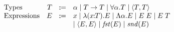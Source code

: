 \[
\begin{array}{lrrl}
  \text{Types} & T & \dcoloneq &
    \alpha
    \mid T \to T
    \mid \forall \alpha. T
    \mid \langle T, T \rangle \\

  \text{Expressions} & E & \dcoloneq &
    x
    \mid \abs{\rel{x}{T}}{E}
    \mid \Abs{\alpha}{E}
    \mid \app{E}{E}
    \mid \app{E}{T} \\ & & &
    \mid \langle E, E \rangle
    \mid \meta{fst} E
    \mid \meta{snd} E
\end{array}
\]
